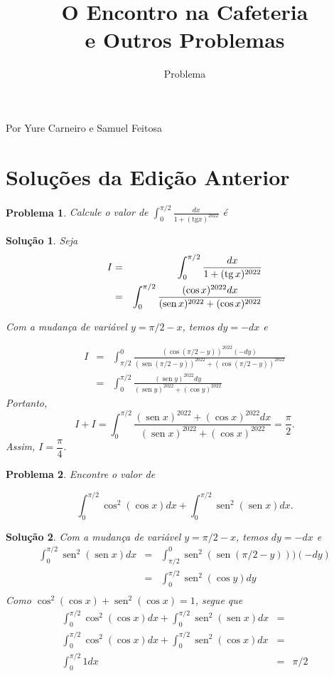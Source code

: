 \documentclass{hipatia}
\title{O Encontro na Cafeteria\\ e Outros Problemas}
\subtitle{Problema}
\DeclareMathOperator{\sen}{sen}
\newtheorem{problem*}{Problema}
\newtheorem*{solution*}{Solução}
\newcommand{\tg}{\mathop{\rm tg}}
\begin{document}
\setcounter{page}{\problemapage}
\maketitle

Por Yure Carneiro e Samuel Feitosa

\section{Soluções da Edição Anterior}

\begin{problem*}
Calcule o valor de $\int_0^{\pi/2} \frac{dx}{1 + (\textrm{tg} x)^{2022}}$ é
\end{problem*}

\begin{solution*}
Seja 
\begin{eqnarray*}
I & = & \int_0^{\pi/2} \frac{dx}{1 + (\tg x)^{2022}} \\
  & = & \int_0^{\pi/2} \frac{(\cos x)^{2022} dx}{(\sen x)^{2022} + (\cos x)^{2022}}
\end{eqnarray*}

Com a mudança de variável $y=\pi/2-x$, temos $dy = -dx$ e

\begin{eqnarray*}
I & = &  \int_{\pi/2}^0 \frac{(\cos (\pi/2-y))^{2022} (-dy)}{(\sen (\pi/2-y))^{2022} + (\cos (\pi/2-y))^{2022}} \\
& = & \int_0^{\pi/2} \frac{(\sen y)^{2022} dy}{(\sen y)^{2022} + (\cos y)^{2022}}
\end{eqnarray*}
Portanto, 
$$I + I = \int_0^{\pi/2} \frac{(\sen x)^{2022}+(\cos x)^{2022} dx}{(\sen x)^{2022}+(\cos x)^{2022}} = \dfrac{\pi}{2}.$$
Assim, $I=\dfrac{\pi}{4}$.

\end{solution*}

\begin{problem*}
Encontre o valor de 

$$\displaystyle \int_0^{\pi/2} \cos^2 (\cos x)dx + \int_0^{\pi/2} \sen^2 (\sen x)dx .$$

\end{problem*}

\begin{solution*}
Com a mudança de variável $y=\pi/2-x$, temos $dy = -dx$ e 
\begin{eqnarray*}
\int_0^{\pi/2} \sen^2 (\sen x)dx & = & \int_{\pi/2}^{0} \sen^2 (\sen (\pi/2-y)))(-dy) \\
                                & = & \int_{0}^{\pi/2} \sen^2 (\cos y)dy \\
\end{eqnarray*}
\noindent Como $\cos^2 (\cos x)+\sen^2(\cos x)=1$, segue que 
\begin{eqnarray*}
\int_0^{\pi/2} \cos^2 (\cos x)dx + \int_0^{\pi/2} \sen^2 (\sen x)dx & = & \\ 
\int_0^{\pi/2} \cos^2 (\cos x)dx + \int_0^{\pi/2} \sen^2 (\cos x)dx & = & \\
\int_0^{\pi/2} 1 dx & = & \pi/2
\end{eqnarray*}
\end{solution*}
\end{document}
